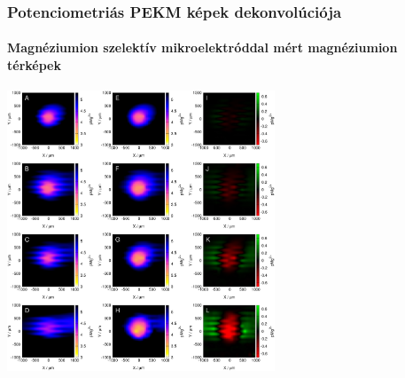 \documentclass{beamer}
\begin{document}
\begin{frame}
\begin{columns}[T]
\begin{column}{.2\textwidth}
\end{column}%
\begin{column}{.2\textwidth}
\begin{minipage}[c][0.75\textheight][c]{\linewidth}
\centering
\end{minipage}
\end{column}%
\end{columns}
\end{frame}

\begin{frame}
\begin{center}
\frametitle{Potenciometriás PEKM képek dekonvolúciója}
\framesubtitle{Magnéziumion szelektív mikroelektróddal mért magnéziumion térképek}
\includegraphics[width=0.6\textwidth]{mg_2d.pdf}
\end{center}
\end{frame}
\end{document}
